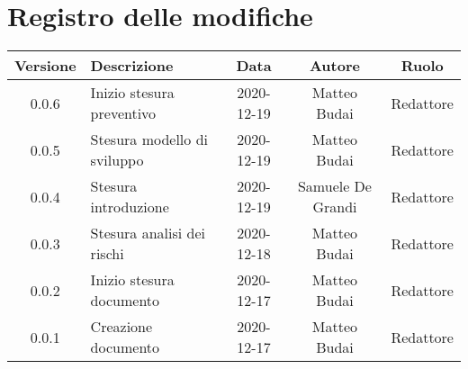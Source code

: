 \section*{Registro delle modifiche}

\begin{center}
	\begin{longtable}{|c|p{5cm}|c|c|c|}
	\hline
	\rowcolor{lighter-grayer}
	\textbf{Versione} & \textbf{Descrizione} & \textbf{Data} & \textbf{Autore} & \textbf{Ruolo} \\
	\hline
	\endfirsthead

	0.0.6 & Inizio stesura preventivo & 2020-12-19 & Matteo Budai & Redattore \\
	\hline
	0.0.5 & Stesura modello di sviluppo & 2020-12-19 & Matteo Budai & Redattore \\
	\hline
	0.0.4 & Stesura introduzione & 2020-12-19 & Samuele De Grandi & Redattore \\
	\hline
	0.0.3 & Stesura analisi dei rischi & 2020-12-18 & Matteo Budai & Redattore \\
	\hline
	0.0.2 & Inizio stesura documento & 2020-12-17 & Matteo Budai & Redattore \\
	\hline
	0.0.1 & Creazione documento & 2020-12-17 & Matteo Budai & Redattore \\
	\hline

	\end{longtable}
\end{center}